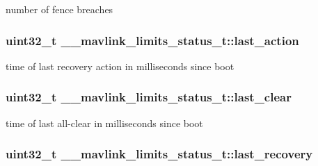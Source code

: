 number of fence breaches 

\hypertarget{struct____mavlink__limits__status__t_a5c4679921b8998a1cd199857a1c06631}{
\subsubsection[{last\+\_\+action}]{\setlength{\rightskip}{0pt plus 5cm}uint32\+\_\+t \+\_\+\+\_\+mavlink\+\_\+limits\+\_\+status\+\_\+t\+::last\+\_\+action}}\label{struct____mavlink__limits__status__t_a5c4679921b8998a1cd199857a1c06631}


time of last recovery action in milliseconds since boot 

\hypertarget{struct____mavlink__limits__status__t_a3f49dbbe3b4de2c3963a0d75eb7e42c4}{
\subsubsection[{last\+\_\+clear}]{\setlength{\rightskip}{0pt plus 5cm}uint32\+\_\+t \+\_\+\+\_\+mavlink\+\_\+limits\+\_\+status\+\_\+t\+::last\+\_\+clear}}\label{struct____mavlink__limits__status__t_a3f49dbbe3b4de2c3963a0d75eb7e42c4}


time of last all-\/clear in milliseconds since boot 

\hypertarget{struct____mavlink__limits__status__t_aa274cf1d2ecf847e3ed9bf3e543a7f20}{
\subsubsection[{last\+\_\+recovery}]{\setlength{\rightskip}{0pt plus 5cm}uint32\+\_\+t \+\_\+\+\_\+mavlink\+\_\+limits\+\_\+status\+\_\+t\+::last\+\_\+recovery}}\label{struct____mavlink__limits__status__t_aa274cf1d2ecf847e3ed9bf3e543a7f20}


